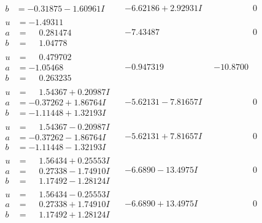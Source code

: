 \documentclass[1p]{elsarticle_modified}
\theoremstyle{definition}
\begin{document}
$$\begin{array}{c|c|c}
\begin{aligned}
b &= -0.31875 - 1.60961 I\end{aligned}
 & -6.62186 + 2.92931 I & \phantom{-0.000000 } 0 \\ \hline\begin{aligned}
u &= -1.49311\phantom{ +0.000000I} \\
a &= \phantom{-}0.281474\phantom{ +0.000000I} \\
b &= \phantom{-}1.04778\phantom{ +0.000000I}\end{aligned}
 & -7.43487\phantom{ +0.000000I} & \phantom{-0.000000 } 0 \\ \hline\begin{aligned}
u &= \phantom{-}0.479702\phantom{ +0.000000I} \\
a &= -1.05468\phantom{ +0.000000I} \\
b &= \phantom{-}0.263235\phantom{ +0.000000I}\end{aligned}
 & -0.947319\phantom{ +0.000000I} & -10.8700\phantom{ +0.000000I} \\ \hline\begin{aligned}
u &= \phantom{-}1.54367 + 0.20987 I \\
a &= -0.37262 + 1.86764 I \\
b &= -1.11448 + 1.32193 I\end{aligned}
 & -5.62131 - 7.81657 I & \phantom{-0.000000 } 0 \\ \hline\begin{aligned}
u &= \phantom{-}1.54367 - 0.20987 I \\
a &= -0.37262 - 1.86764 I \\
b &= -1.11448 - 1.32193 I\end{aligned}
 & -5.62131 + 7.81657 I & \phantom{-0.000000 } 0 \\ \hline\begin{aligned}
u &= \phantom{-}1.56434 + 0.25553 I \\
a &= \phantom{-}0.27338 - 1.74910 I \\
b &= \phantom{-}1.17492 - 1.28124 I\end{aligned}
 & -6.6890 - 13.4975 I & \phantom{-0.000000 } 0 \\ \hline\begin{aligned}
u &= \phantom{-}1.56434 - 0.25553 I \\
a &= \phantom{-}0.27338 + 1.74910 I \\
b &= \phantom{-}1.17492 + 1.28124 I\end{aligned}
 & -6.6890 + 13.4975 I & \phantom{-0.000000 } 0 \\ \hline\begin{aligned}

\end{aligned}
\end{array}$$
\end{document}
